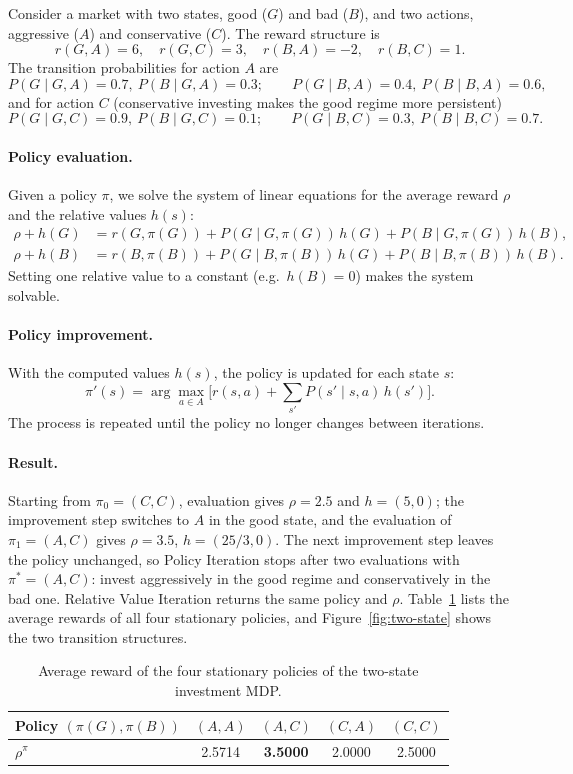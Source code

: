 \documentclass[11pt,a4paper]{article}
\begin{document}
Consider a market with two states, good ($G$) and bad ($B$), and two actions, aggressive ($A$) and conservative ($C$). The reward structure is
\[
  r(G,A)=6,\quad r(G,C)=3,\quad r(B,A)=-2,\quad r(B,C)=1.
\]
The transition probabilities for action $A$ are
\[
  P(G\mid G,A)=0.7,\ P(B\mid G,A)=0.3;\qquad P(G\mid B,A)=0.4,\ P(B\mid B,A)=0.6,
\]
and for action $C$ (conservative investing makes the good regime more persistent)
\[
  P(G\mid G,C)=0.9,\ P(B\mid G,C)=0.1;\qquad P(G\mid B,C)=0.3,\ P(B\mid B,C)=0.7.
\]

\paragraph{Policy evaluation.} Given a policy $\pi$, we solve the system of linear equations for the average reward $\rho$ and the relative values $h(s)$:
\begin{align*}
  \rho+h(G)&=r(G,\pi(G))+P(G\mid G,\pi(G))\,h(G)+P(B\mid G,\pi(G))\,h(B),\\
  \rho+h(B)&=r(B,\pi(B))+P(G\mid B,\pi(B))\,h(G)+P(B\mid B,\pi(B))\,h(B).
\end{align*}
Setting one relative value to a constant (e.g.\ $h(B)=0$) makes the system solvable.

\paragraph{Policy improvement.} With the computed values $h(s)$, the policy is updated for each state $s$:
\[
  \pi'(s)=\arg\max_{a\in A}\Big[r(s,a)+\sum_{s'}P(s'\mid s,a)\,h(s')\Big].
\]
The process is repeated until the policy no longer changes between iterations.

\paragraph{Result.} Starting from $\pi_0=(C,C)$, evaluation gives $\rho=2.5$ and $h=(5,0)$; the improvement step switches to $A$ in the good state, and the evaluation of $\pi_1=(A,C)$ gives $\rho=3.5$, $h=(25/3,0)$. The next improvement step leaves the policy unchanged, so Policy Iteration stops after two evaluations with $\pi^*=(A,C)$: invest aggressively in the good regime and conservatively in the bad one. Relative Value Iteration returns the same policy and $\rho$. Table~\ref{tab:policies} lists the average rewards of all four stationary policies, and Figure~\ref{fig:two-state} shows the two transition structures.

\begin{table}[H]
\centering
\caption{Average reward of the four stationary policies of the two-state investment MDP.}
\label{tab:policies}
\begin{tabular}{lcccc}
\toprule
Policy $(\pi(G),\pi(B))$ & $(A,A)$ & $(A,C)$ & $(C,A)$ & $(C,C)$\\
\midrule
$\rho^\pi$ & 2.5714 & \textbf{3.5000} & 2.0000 & 2.5000\\
\bottomrule
\end{tabular}
\end{table}
\end{document}
